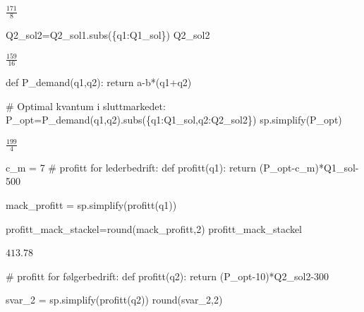 \documentclass[
  12pt,
  a4paper,
  DIV=11,
  numbers=noendperiod]{scrartcl}
\newenvironment{Shaded}{\begin{snugshade}}{\end{snugshade}}
\newcommand{\BuiltInTok}[1]{\textcolor[rgb]{0.00,0.23,0.31}{#1}}
\newcommand{\CommentTok}[1]{\textcolor[rgb]{0.37,0.37,0.37}{#1}}
\newcommand{\ControlFlowTok}[1]{\textcolor[rgb]{0.00,0.23,0.31}{#1}}
\newcommand{\DecValTok}[1]{\textcolor[rgb]{0.68,0.00,0.00}{#1}}
\newcommand{\KeywordTok}[1]{\textcolor[rgb]{0.00,0.23,0.31}{#1}}
\newcommand{\NormalTok}[1]{\textcolor[rgb]{0.00,0.23,0.31}{#1}}
\newcommand{\OperatorTok}[1]{\textcolor[rgb]{0.37,0.37,0.37}{#1}}
\begin{document}
$\displaystyle \frac{171}{8}$

\begin{Shaded}
\begin{Highlighting}[]
\NormalTok{Q2\_sol2}\OperatorTok{=}\NormalTok{Q2\_sol1.subs(\{q1:Q1\_sol\})}
\NormalTok{Q2\_sol2}
\end{Highlighting}
\end{Shaded}

$\displaystyle \frac{159}{16}$

\begin{Shaded}
\begin{Highlighting}[]
\KeywordTok{def}\NormalTok{ P\_demand(q1,q2):}
    \ControlFlowTok{return}\NormalTok{ a}\OperatorTok{{-}}\NormalTok{b}\OperatorTok{*}\NormalTok{(q1}\OperatorTok{+}\NormalTok{q2)}

\CommentTok{\# Optimal kvantum i sluttmarkedet:}
\NormalTok{P\_opt}\OperatorTok{=}\NormalTok{P\_demand(q1,q2).subs(\{q1:Q1\_sol,q2:Q2\_sol2\})}
\NormalTok{sp.simplify(P\_opt)}
\end{Highlighting}
\end{Shaded}

$\displaystyle \frac{199}{4}$

\begin{Shaded}
\begin{Highlighting}[]
\NormalTok{c\_m }\OperatorTok{=} \DecValTok{7}
\CommentTok{\# profitt for lederbedrift:}
\KeywordTok{def}\NormalTok{ profitt(q1):}
    \ControlFlowTok{return}\NormalTok{ (P\_opt}\OperatorTok{{-}}\NormalTok{c\_m)}\OperatorTok{*}\NormalTok{Q1\_sol}\OperatorTok{{-}}\DecValTok{500}

\NormalTok{mack\_profitt }\OperatorTok{=}\NormalTok{ sp.simplify(profitt(q1))}

\NormalTok{profitt\_mack\_stackel}\OperatorTok{=}\BuiltInTok{round}\NormalTok{(mack\_profitt,}\DecValTok{2}\NormalTok{)}
\NormalTok{profitt\_mack\_stackel}
\end{Highlighting}
\end{Shaded}

$\displaystyle 413.78$

\begin{Shaded}
\begin{Highlighting}[]
\CommentTok{\# profitt for følgerbedrift:}
\KeywordTok{def}\NormalTok{ profitt(q2):}
    \ControlFlowTok{return}\NormalTok{ (P\_opt}\OperatorTok{{-}}\DecValTok{10}\NormalTok{)}\OperatorTok{*}\NormalTok{Q2\_sol2}\OperatorTok{{-}}\DecValTok{300}

\NormalTok{svar\_2 }\OperatorTok{=}\NormalTok{ sp.simplify(profitt(q2))}
\BuiltInTok{round}\NormalTok{(svar\_2,}\DecValTok{2}\NormalTok{)}
\end{Highlighting}
\end{Shaded}
\end{document}
